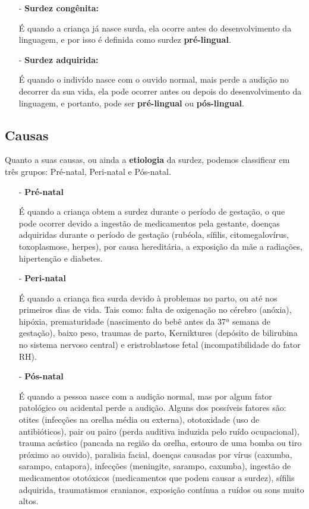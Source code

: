 \documentclass[brasil]{abnt}
\begin{document}
				\begin{itemize}		
					\item [-]\textbf{Surdez congênita:} 
					
						É quando a criança já nasce surda, ela ocorre antes do desenvolvimento da linguagem, e por isso é definida como 
						surdez \textbf{pré-lingual}. 
						
					\item[-]\textbf{Surdez adquirida:} 
					
						É quando o indivído nasce com o ouvido normal, mais perde a audição no decorrer da sua vida, ela pode ocorrer antes ou depois do 
						desenvolvimento da linguagem, e portanto, pode ser \textbf{pré-lingual} ou \textbf{pós-lingual}.
				\end{itemize}
				
				
			\subsection{Causas}
				Quanto a suas causas, ou ainda a \textbf{etiologia} da surdez, podemos classificar em três grupos: Pré-natal, Peri-natal e Pós-natal.
			
				\begin{itemize}		
					\item [-] \textbf{Pré-natal} 
					
						É quando a criança obtem a surdez durante o período de gestação, o que pode ocorrer devido a ingestão de medicamentos pela gestante, doenças adquiridas durante o período de gestação 
						(rubéola, sífilis, citomegalovírus, toxoplasmose, herpes), por causa hereditária, a exposição da mãe a radiações, hipertenção e diabetes.
				
					\item [-]\textbf{Peri-natal} 
					
						É quando a criança fica surda devido à problemas no parto, ou até nos primeiros dias de vida. Tais como: falta de oxigenação no cérebro (anóxia), hipóxia, prematuridade (nascimento do bebê antes da 
						37ª semana de gestação), baixo peso, traumas de parto, Kerniktures (depósito de bilirubina no sistema nervoso central) e eristroblastose fetal (incompatibilidade do fator RH). 
					
					\item [-]\textbf{Pós-natal}	
					
						É quando a pessoa nasce com a audição normal, mas por algum fator patológico ou acidental perde a audição. Alguns dos possíveis fatores são: otites (infecções na orelha média ou externa), 
						ototoxidade (uso de antibióticos), pair ou pairo (perda auditiva induzida pelo ruído ocupacional), trauma acústico (pancada na região da orelha, estouro de uma bomba ou tiro próximo ao ouvido), 
						paralisia facial, doenças causadas por vírus (caxumba, sarampo, catapora), infecções (meningite, sarampo, caxumba), ingestão de medicamentos ototóxicos (medicamentos que podem causar a surdez), 
						sífilis adquirida, traumatismos cranianos, exposição contínua a ruídos ou sons muito altos. 
				
				\end{itemize}
											
\end{document}
